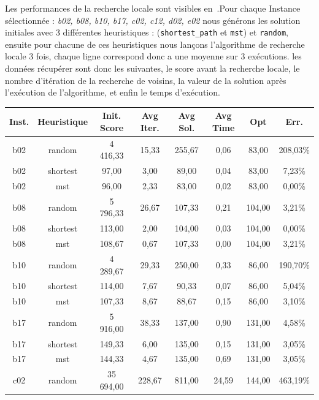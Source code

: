 \documentclass[10pt]{article}
\begin{document}
	Les performances de la recherche locale sont visibles en~.Pour chaque Instance sélectionnée : \textit{b02, b08, b10, b17, c02, c12, d02, e02} nous générons les solution initiales avec 3 différentes heuristiques : (\texttt{shortest\_path} et \texttt{mst}) et \texttt{random}, ensuite pour chacune de ces heuristiques nous lançons l'algorithme de recherche locale 3 fois, chaque ligne correspond donc a une moyenne sur 3 exécutions. les données récupérer sont donc les suivantes, le score avant la recherche locale, le nombre d'itération de la recherche de voisins, la valeur de la solution après l'exécution de l'algorithme, et enfin le temps d'exécution. 
	\begin{table}[h!]
		\centering
		\begin{tabular}{|c|c|c|c|c|c|c|c|}
		\hline
\textbf{Inst.} & \textbf{Heuristique} & \textbf{Init. \linebreak Score} & \textbf{Avg Iter.} & \textbf{Avg Sol.} & \textbf{Avg Time} & \textbf{Opt} & \textbf{Err.} \\
\hline
b02 & random & 4 416,33 & 15,33 & 255,67 & 0,06 & 83,00 & 208,03\% \\
b02 & shortest & 97,00 & 3,00 & 89,00 & 0,04 & 83,00 & 7,23\% \\
\rowcolor{yellow!60} b02 & mst & 96,00 & 2,33 & 83,00 & 0,02 & 83,00 & 0,00\% \\
\hline
b08 & random & 5 796,33 & 26,67 & 107,33 & 0,21 & 104,00 & 3,21\% \\
\rowcolor{yellow!60} b08 & shortest & 113,00 & 2,00 & 104,00 & 0,03 & 104,00 & 0,00\% \\
b08 & mst & 108,67 & 0,67 & 107,33 & 0,00 & 104,00 & 3,21\% \\
\hline
b10 & random & 4 289,67 & 29,33 & 250,00 & 0,33 & 86,00 & 190,70\% \\
b10 & shortest & 114,00 & 7,67 & 90,33 & 0,07 & 86,00 & 5,04\% \\
\rowcolor{yellow!60} b10 & mst & 107,33 & 8,67 & 88,67 & 0,15 & 86,00 & 3,10\% \\
\hline
b17 & random & 5 916,00 & 38,33 & 137,00 & 0,90 & 131,00 & 4,58\% \\
\rowcolor{yellow!60} b17 & shortest & 149,33 & 6,00 & 135,00 & 0,15 & 131,00 & 3,05\% \\
\rowcolor{yellow!60} b17 & mst & 144,33 & 4,67 & 135,00 & 0,69 & 131,00 & 3,05\% \\
\hline
c02 & random & 35 694,00 & 228,67 & 811,00 & 24,59 & 144,00 & 463,19\% \\

\end{tabular}
\end{table}
\end{document}
